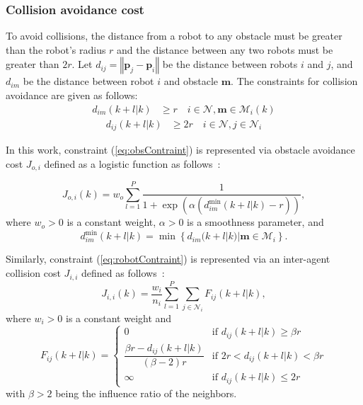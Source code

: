 \subsubsection{Collision avoidance cost}
To avoid collisions, the distance from a robot to any obstacle must be greater than the robot's radius $r$ and the distance between any two robots must be greater than $2r$. Let $d_{ij}=\left\Vert \mathbf{p}_j-\mathbf{p}_i\right\Vert$ be the distance between robots $i$ and $j$, and $d_{im}$ be the distance between robot $i$ and obstacle $\mathbf{m}$. The constraints for collision avoidance  are given as follows:
\begin{equation}
\begin{aligned}
    d_{im}(k+l|k)&\geq r \quad i\in\mathcal{N}, \mathbf{m}\in\mathcal{M}_i(k)
    \label{eq:obsContraint}
\end{aligned}
\end{equation}
\begin{equation}
\begin{aligned}
    d_{ij}(k+l|k)&\geq 2r \quad i\in\mathcal{N},j\in\mathcal{N}_i
    \label{eq:robotContraint}
\end{aligned}
\end{equation}

In this work, constraint (\ref{eq:obsContraint}) is represented via obstacle avoidance cost $J_{o,i}$ defined as a logistic function as follows~\cite{8202163}:   

\begin{equation}
    J_{o,i}(k) = w_o\sum_{l=1}^P \dfrac{1}{1 + \exp{\left(\alpha\left(d_{im}^\text{min}(k+l|k) - r\right)\right)}},
\end{equation}
where $w_o > 0$ is a constant weight, $\alpha > 0$ is a smoothness parameter, and
\begin{equation}
    d_{im}^\text{min}(k+l|k)=\min\left\{d_{im}(k+l|k)|\mathbf{m}\in\mathcal{M}_i\right\}.
\end{equation}

Similarly, constraint (\ref{eq:robotContraint}) is represented via an inter-agent collision cost $J_{i,i}$ defined as follows~\cite{736776}:
\begin{equation}
    J_{i,i}(k)=\dfrac{w_i}{n_i}\sum_{l=1}^P{\sum_{j\in\mathcal{N}_i}}F_{ij}(k+l|k),
\end{equation}
where $w_i>0$ is a constant weight and  
\begin{equation}
    F_{ij}(k+l|k)=\begin{cases}
        0   & \text{if } d_{ij}(k+l|k) \geq \beta r\\
        \dfrac{\beta r-d_{ij}(k+l|k)}{(\beta-2)r}    & \text{if } 2r < d_{ij}(k+l|k) < \beta r\\
        \infty  & \text{if } d_{ij}(k+l|k) \leq 2r
    \end{cases}
\end{equation} 
with $\beta>2$ being the influence ratio of the neighbors.

